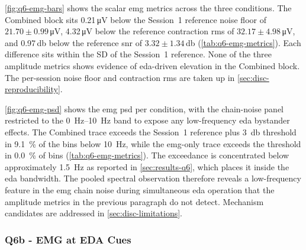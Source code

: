\autoref{fig:q6-emg-bars} shows the scalar \gls{emg} metrics across the three conditions. The Combined block sits 0.21\,\si{\micro\volt} below the Session~1 reference noise floor of $\num{21.70} \pm \num{0.99}$\,\si{\micro\volt}, 4.32\,\si{\micro\volt} below the reference contraction \gls{rms} of $\num{32.17} \pm \num{4.98}$\,\si{\micro\volt}, and 0.97\,\si{\decibel} below the reference \gls{snr} of $\num{3.32} \pm \num{1.34}$\,\si{\decibel} (\autoref{tab:q6-emg-metrics}). Each difference sits within the SD of the Session~1 reference. None of the three amplitude metrics shows evidence of \gls{eda}-driven elevation in the Combined block. The per-session noise floor and contraction \gls{rms} are taken up in \autoref{sec:disc-reproducibility}.

\autoref{fig:q6-emg-psd} shows the \gls{emg} \gls{psd} per condition, with the chain-noise panel restricted to the \SIrange{0}{10}{\hertz} band to expose any low-frequency \gls{eda} bystander effects. The Combined trace exceeds the Session~1 reference plus \SI{3}{\decibel} threshold in \SI{9.1}{\percent} of the bins below \SI{10}{\hertz}, while the \gls{emg}-only trace exceeds the threshold in \SI{0.0}{\percent} of bins (\autoref{tab:q6-emg-metrics}). The exceedance is concentrated below approximately \SI{1.5}{\hertz} as reported in \autoref{sec:results-q6}, which places it inside the \gls{eda} bandwidth. The pooled spectral observation therefore reveals a low-frequency feature in the \gls{emg} chain noise during simultaneous \gls{eda} operation that the amplitude metrics in the previous paragraph do not detect. Mechanism candidates are addressed in \autoref{sec:disc-limitations}.


\subsubsection{Q6b - EMG at EDA Cues}
\label{sec:disc-q6b}

